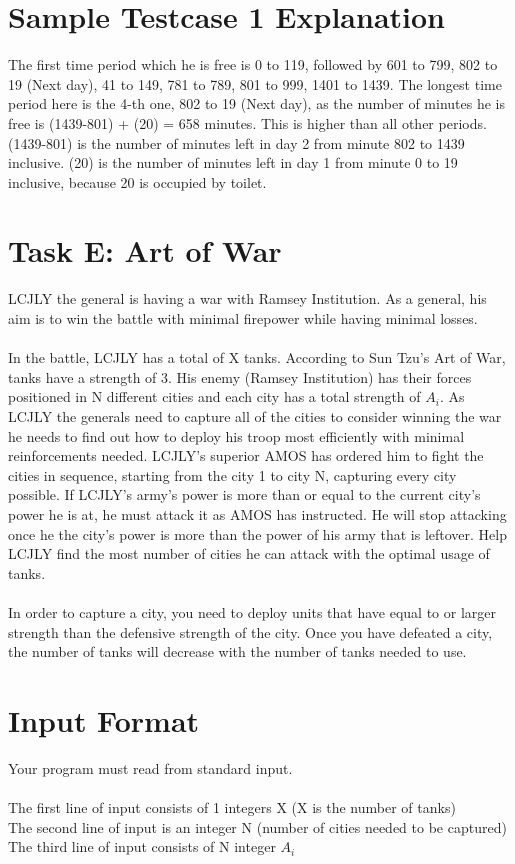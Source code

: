 \documentclass{report}
\begin{document}
\pagebreak 
\hfill \break \hfill \break

\section*{Sample Testcase 1 Explanation}
The first time period which he is free is 0 to 119, followed by 601 to 799, 802 to 19 (Next day), 41 to 149, 781 to 789, 801 to 999, 1401 to 1439.
The longest time period here is the 4-th one, 802 to 19 (Next day), as the number of minutes he is free is (1439-801) + (20) = 658 minutes. This is higher than all other periods. (1439-801) is the number of minutes left in day 2 from minute 802 to 1439 inclusive. (20) is the number of minutes left in day 1 from minute 0 to 19 inclusive, because 20 is occupied by toilet.

\pagebreak
\hfill \break \hfill \break

\section*{Task E: Art of War}
LCJLY the general is having a war with Ramsey Institution. As a general, his aim is to win the battle with minimal firepower while having minimal losses.
\\
\\
In the battle, LCJLY has a total of X tanks. According to Sun Tzu's Art of War, tanks have a strength of 3. His enemy (Ramsey Institution) has their forces positioned in N different cities and each city has a total strength of $A_i$. As LCJLY the generals need to capture all of the cities to consider winning the war he needs to find out how to deploy his troop most efficiently with minimal reinforcements needed. LCJLY's superior AMOS has ordered him to fight the cities in sequence, starting from the city 1 to city N, capturing every city possible. If LCJLY's army's power is more than or equal to the current city's power he is at, he must attack it as AMOS has instructed. He will stop attacking once he the city's power is more than the power of his army that is leftover. Help LCJLY find the most number of cities he can attack with the optimal usage of tanks.
\\
\\
In order to capture a city, you need to deploy units that have equal to or larger strength than the defensive strength of the city. Once you have defeated a city, the number of tanks will decrease with the number of tanks needed to use.

\section*{Input Format}
Your program must read from standard input.
\\\\
The first line of input consists of 1 integers X (X is the number of tanks) 
\\
The second line of input is an integer N (number of cities needed to be captured)
\\
The third line of input consists of N integer $A_i$ 
\end{document}
